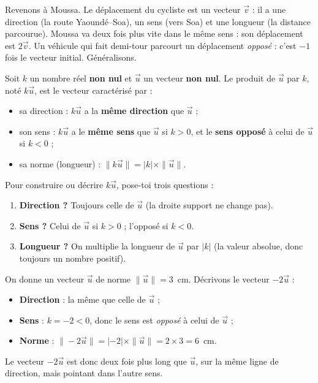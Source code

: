 \documentclass[11pt]{article}
\newcommand{\cle}[1]{{\popxbold\color{popdark}#1}}
\begin{document}
Revenons à Moussa. Le déplacement du cycliste est un vecteur $\vec{v}$ : il a une direction (la route Yaoundé--Soa), un sens (vers Soa) et une longueur (la distance parcourue). Moussa va deux fois plus vite dans le même sens : son déplacement est $2\vec{v}$. Un véhicule qui fait demi-tour parcourt un déplacement \emph{opposé} : c'est $-1$ fois le vecteur initial. Généralisons.

\begin{definition}
Soit $k$ un nombre réel \textbf{non nul} et $\vec{u}$ un vecteur \textbf{non nul}. Le produit de $\vec{u}$ par $k$, noté $k\vec{u}$, est le vecteur caractérisé par :
\begin{itemize}
\item sa \cle{direction} : $k\vec{u}$ a la \textbf{même direction} que $\vec{u}$ ;
\item son \cle{sens} : $k\vec{u}$ a le \textbf{même sens} que $\vec{u}$ si $k > 0$, et le \textbf{sens opposé} à celui de $\vec{u}$ si $k < 0$ ;
\item sa \cle{norme} (longueur) : $\|k\vec{u}\| = |k| \times \|\vec{u}\|$.
\end{itemize}
\end{definition}

\begin{aretenir}
Pour construire ou décrire $k\vec{u}$, pose-toi trois questions :
\begin{enumerate}
\item \textbf{Direction ?} Toujours celle de $\vec{u}$ (la droite support ne change pas).
\item \textbf{Sens ?} Celui de $\vec{u}$ si $k > 0$ ; l'opposé si $k < 0$.
\item \textbf{Longueur ?} On multiplie la longueur de $\vec{u}$ par $|k|$ (la valeur absolue, donc toujours un nombre positif).
\end{enumerate}
\end{aretenir}

\begin{exemplebox}
On donne un vecteur $\vec{u}$ de norme $\|\vec{u}\| = 3$~cm. Décrivons le vecteur $-2\vec{u}$ :
\begin{itemize}
\item \textbf{Direction} : la même que celle de $\vec{u}$ ;
\item \textbf{Sens} : $k = -2 < 0$, donc le sens est \emph{opposé} à celui de $\vec{u}$ ;
\item \textbf{Norme} : $\|-2\vec{u}\| = |-2| \times \|\vec{u}\| = 2 \times 3 = 6$~cm.
\end{itemize}
Le vecteur $-2\vec{u}$ est donc deux fois plus long que $\vec{u}$, sur la même ligne de direction, mais pointant dans l'autre sens.
\end{exemplebox}
\end{document}
